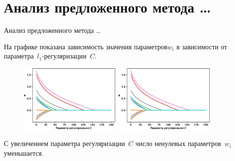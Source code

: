 \documentclass[10pt,pdf,hyperref={unicode}]{beamer}
\begin{document}
\section{Анализ предложенного метода \ldots}
\begin{frame}{Анализ предложенного метода \ldots}
\justifying

На графике показана зависимость значения параметров$w_i$ в зависимости от параметра~$l_1$-регуляризации~$C$.
\begin{figure}[h!]
\includegraphics[width=0.45\textwidth]{../figures/log_reg_cs_exp.eps}
\includegraphics[width=0.45\textwidth]{../figures/log_reg_cs_exp.eps}
\end{figure}

С увеличением параметра регуляризации~$C$ число ненулевых параметров~$w_i$ уменьшается.

\end{frame}

\end{document}
